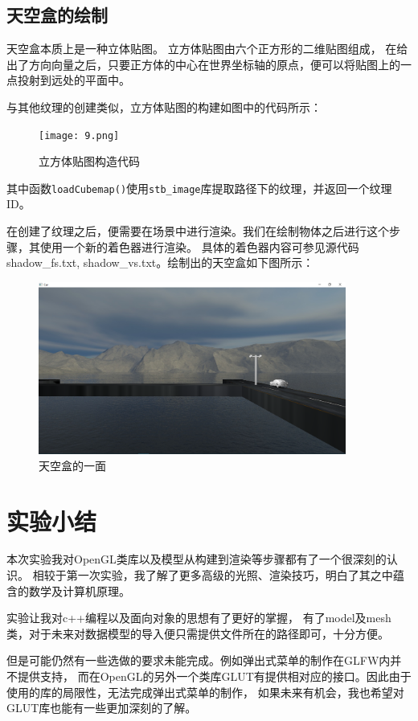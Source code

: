 \documentclass[UTF8]{ctexart}
\begin{document}
\subsection{天空盒的绘制}
\par
天空盒本质上是一种立体贴图。
立方体贴图由六个正方形的二维贴图组成，
在给出了方向向量之后，只要正方体的中心在世界坐标轴的原点，便可以将贴图上的一点投射到远处的平面中。

\par
与其他纹理的创建类似，立方体贴图的构建如图中的代码所示：

\begin{figure}[h]
	\centering
	\texttt{[image: 9.png]}
	\caption{立方体贴图构造代码}
    \label{fig:9}
\end{figure}

\par
其中函数\verb|loadCubemap()|使用\verb|stb_image|库提取路径下的纹理，并返回一个纹理ID。

\par
在创建了纹理之后，便需要在场景中进行渲染。我们在绘制物体之后进行这个步骤，其使用一个新的着色器进行渲染。
具体的着色器内容可参见源代码shadow\_fs.txt, shadow\_vs.txt。绘制出的天空盒如下图所示：

\begin{figure}[h]
	\centering
	\includegraphics*[width=0.9\textwidth]{10.png}
	\caption{天空盒的一面}
    \label{fig:10}
\end{figure}

\section{实验小结}
\par
本次实验我对OpenGL类库以及模型从构建到渲染等步骤都有了一个很深刻的认识。
相较于第一次实验，我了解了更多高级的光照、渲染技巧，明白了其之中蕴含的数学及计算机原理。
\par
实验让我对c++编程以及面向对象的思想有了更好的掌握，
有了model及mesh类，对于未来对数据模型的导入便只需提供文件所在的路径即可，十分方便。
\par
但是可能仍然有一些选做的要求未能完成。例如弹出式菜单的制作在GLFW内并不提供支持，
而在OpenGL的另外一个类库GLUT有提供相对应的接口。因此由于使用的库的局限性，无法完成弹出式菜单的制作，
如果未来有机会，我也希望对GLUT库也能有一些更加深刻的了解。
\end{document}

